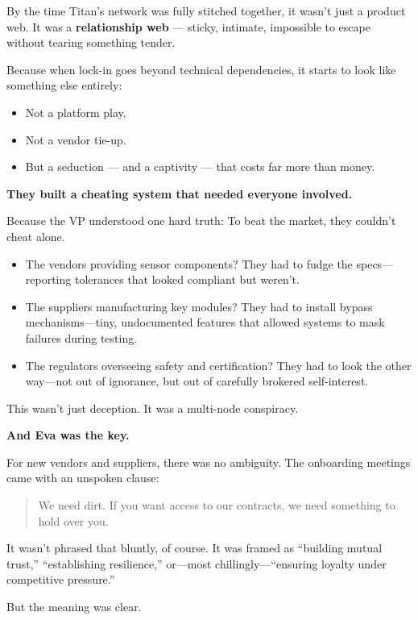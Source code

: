 By the time Titan’s network was fully stitched together, it wasn’t just a product web.  
It was a \textbf{relationship web} — sticky, intimate, impossible to escape without tearing something tender.

Because when lock-in goes beyond technical dependencies, it starts to look like something else entirely:  

\begin{itemize}
    \item Not a platform play.  
    \item Not a vendor tie-up.  
    \item But a seduction — and a captivity — that costs far more than money.
\end{itemize}

\medskip

\textbf{They built a cheating system that needed everyone involved.}

Because the VP understood one hard truth: To beat the market, they couldn’t cheat alone.

\begin{itemize}
\item The vendors providing sensor components?
They had to fudge the specs—reporting tolerances that looked compliant but weren’t.
\item The suppliers manufacturing key modules?
They had to install bypass mechanisms—tiny, undocumented features that allowed systems to mask failures during testing.
\item The regulators overseeing safety and certification?
They had to look the other way—not out of ignorance, but out of carefully brokered self-interest.
\end{itemize}

This wasn’t just deception.  It was a multi-node conspiracy.

\textbf{And Eva was the key.}

For new vendors and suppliers, there was no ambiguity.  The onboarding meetings came with an unspoken clause:

\begin{quote}
We need dirt.
If you want access to our contracts,
we need something to hold over you.
\end{quote}

It wasn’t phrased that bluntly, of course.
It was framed as “building mutual trust,” “establishing resilience,”
or—most chillingly—“ensuring loyalty under competitive pressure.”

But the meaning was clear.


